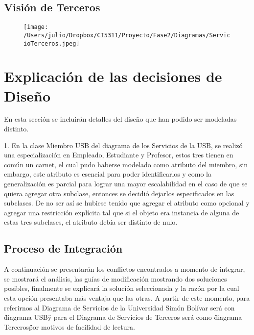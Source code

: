 \documentclass[12pt,a4paper,spanish]{article}
\begin{document}
\newpage
\subsection{Visi\'on de Terceros}
\begin{landscape}
\begin{figure}
    \texttt{[image: /Users/julio/Dropbox/CI5311/Proyecto/Fase2/Diagramas/ServicioTerceros.jpeg]}
\end{figure} 
\end{landscape}
\newpage

\section{Explicaci\'on de las decisiones de Dise\~no}
 En esta secci\'on se incluir\'an detalles del dise\~no que han podido ser modeladas distinto.
 \newline
 \newline
 
 1. En la clase Miembro USB del diagrama de los Servicios de la USB, se realiz\'o una especializaci\'on en Empleado, Estudiante y Profesor, estos tres tienen en com\'un un carnet,
 el cual pudo haberse modelado como atributo del miembro, sin embargo, este atributo es esencial para poder identificarlos y como la generalizaci\'on es parcial para lograr
 una mayor escalabilidad en el caso de que se quiera agregar otra subclase, entonces se decidi\'o dejarlos especificados en las subclases. De no ser as\'i se hubiese tenido
 que agregar el atributo como opcional y agregar una restricci\'on expl\'icita tal que si el objeto era instancia de alguna de estas tres subclases, el atributo deb\'ia ser distinto
 de nulo.
\newline
\newline

 \subsection{Proceso de Integraci\'on}
 \indent A continuaci\'on se presentar\'an los conflictos encontrados a momento de integrar, se mostrar\'a el an\'alisis, las gu\'ias de modificaci\'on mostrando dos soluciones posibles, finalmente se explicar\'a la soluci\'on seleccionada y la raz\'on por la cual esta opci\'on presentaba m\'as ventaja que las otras. A partir de este momento, para referirnos al Diagrama de Servicios de la Universidad Sim\'on Bol\'ivar ser\'a con \"diagrama USB\" y para el Diagrama de Servicios de Terceros ser\'a como \"diagrama Terceros\" por motivos de facilidad de lectura. 
\end{document}
